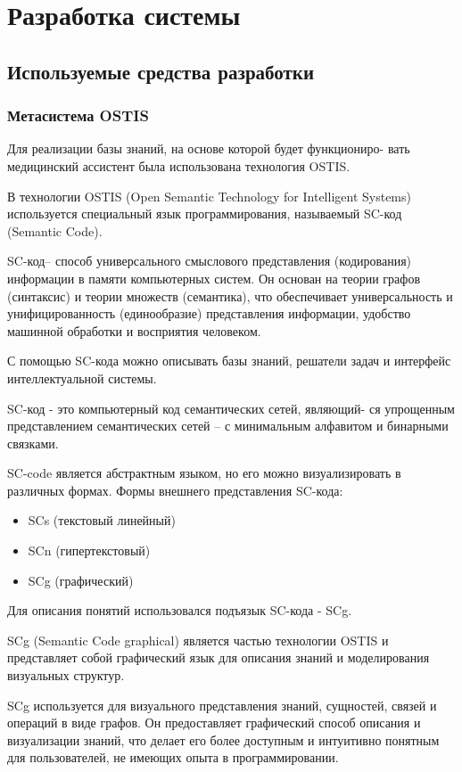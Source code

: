 \section{Разработка системы}
\label{sec:development}

\subsection{Используемые средства разработки}

\subsubsection{Метасистема OSTIS}

Для реализации базы знаний, на основе которой будет функциониро-
вать медицинский ассистент была использована технология OSTIS.

В технологии OSTIS (Open Semantic Technology for Intelligent Systems) используется специальный язык программирования, называемый SC-код (Semantic Code).
 
SC-код– способ универсального смыслового представления (кодирования) информации в памяти компьютерных систем. Он основан на теории графов (синтаксис) и теории множеств (семантика), что обеспечивает универсальность и унифицированность (единообразие) представления информации,
удобство машинной обработки и восприятия человеком. 

С помощью SC-кода можно описывать базы знаний, решатели задач и интерфейс интеллектуальной системы.

SC-код - это компьютерный код семантических сетей, являющий-
ся упрощенным представлением семантических сетей – с минимальным
алфавитом и бинарными связками.

SC-code является абстрактным языком, но его можно визуализировать в различных формах. Формы внешнего представления SC-кода: 
\begin{itemize}
    \item SCs (текстовый линейный)
    \item SCn (гипертекстовый)
    \item SCg (графический)
\end{itemize}

Для описания понятий использовался подъязык SC-кода - SCg.

SCg (Semantic Code graphical) является частью технологии OSTIS и представляет собой графический язык для описания знаний и моделирования визуальных структур.

SCg используется для визуального представления знаний, сущностей, связей и операций в виде графов. Он предоставляет графический способ описания и визуализации знаний, что делает его более доступным и интуитивно понятным для пользователей, не имеющих опыта в программировании.


